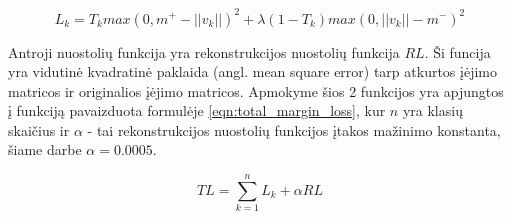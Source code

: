 \begin{equation}
\label{eqn:margin_loss}
	L_{k} = T_k max(0, m^+ - ||v_k||)^2 + \lambda (1 - T_k) max(0, ||v_k|| - m^-)^2
\end{equation}

Antroji nuostolių funkcija yra rekonstrukcijos nuostolių funkcija $RL$. Ši funcija yra vidutinė kvadratinė paklaida (angl. mean square error) tarp atkurtos įėjimo matricos ir originalios įėjimo matricos. Apmokyme šios 2 funkcijos yra apjungtos į funkciją pavaizduota formulėje \ref{eqn:total_margin_loss}, kur $n$ yra klasių skaičius ir $\alpha$ - tai rekonstrukcijos nuostolių funkcijos įtakos mažinimo konstanta, šiame darbe $\alpha = 0.0005$.

\begin{equation}
\label{eqn:total_margin_loss}
	TL = \sum_{k = 1}^{n} L_{k} + \alpha RL
\end{equation}
